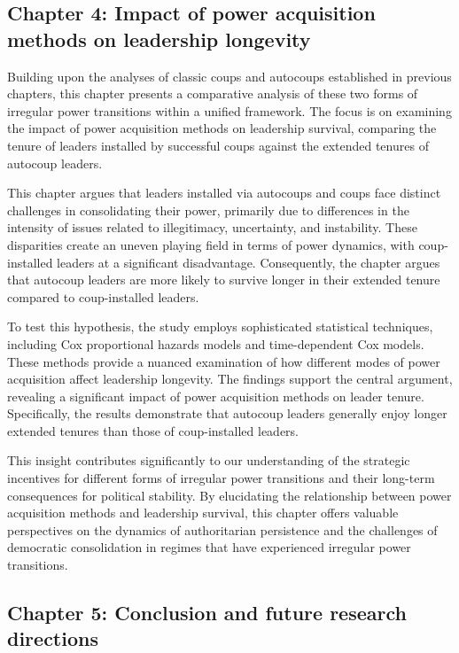 \documentclass[
  12pt,
]{report}
\begin{document}
\subsection*{Chapter 4: Impact of power acquisition methods on
leadership
longevity}\label{chapter-4-impact-of-power-acquisition-methods-on-leadership-longevity}

Building upon the analyses of classic coups and autocoups established in
previous chapters, this chapter presents a comparative analysis of these
two forms of irregular power transitions within a unified framework. The
focus is on examining the impact of power acquisition methods on
leadership survival, comparing the tenure of leaders installed by
successful coups against the extended tenures of autocoup leaders.

This chapter argues that leaders installed via autocoups and coups face
distinct challenges in consolidating their power, primarily due to
differences in the intensity of issues related to illegitimacy,
uncertainty, and instability. These disparities create an uneven playing
field in terms of power dynamics, with coup-installed leaders at a
significant disadvantage. Consequently, the chapter argues that autocoup
leaders are more likely to survive longer in their extended tenure
compared to coup-installed leaders.

To test this hypothesis, the study employs sophisticated statistical
techniques, including Cox proportional hazards models and time-dependent
Cox models. These methods provide a nuanced examination of how different
modes of power acquisition affect leadership longevity. The findings
support the central argument, revealing a significant impact of power
acquisition methods on leader tenure. Specifically, the results
demonstrate that autocoup leaders generally enjoy longer extended
tenures than those of coup-installed leaders.

This insight contributes significantly to our understanding of the
strategic incentives for different forms of irregular power transitions
and their long-term consequences for political stability. By elucidating
the relationship between power acquisition methods and leadership
survival, this chapter offers valuable perspectives on the dynamics of
authoritarian persistence and the challenges of democratic consolidation
in regimes that have experienced irregular power transitions.

\subsection*{Chapter 5: Conclusion and future research
directions}\label{chapter-5-conclusion-and-future-research-directions}
\end{document}
